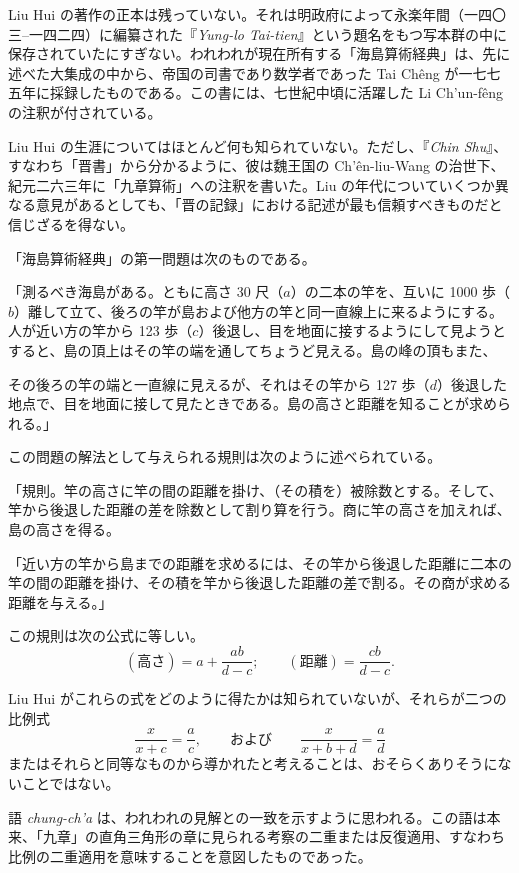 \documentclass[11pt]{article}
\newcommand{\scanpage}[2]{\clearpage\setcounter{footnote}{0}\noindent{\footnotesize\color{gray}PDF #1 頁 · #2}\par\medskip}
\newcommand{\scanfooter}{}
\begin{document}
Liu Hui の著作の正本は残っていない。それは明政府によって永楽年間（一四〇三--一四二四）に編纂された『\emph{Yung-lo Tai-tien}』という題名をもつ写本群の中に保存されていたにすぎない。われわれが現在所有する「海島算術経典」は、先に述べた大集成の中から、帝国の司書であり数学者であった Tai Chêng が一七七五年に採録したものである。この書には、七世紀中頃に活躍した Li Ch'un-fêng の注釈が付されている。

Liu Hui の生涯についてはほとんど何も知られていない。ただし、『\emph{Chin Shu}』、すなわち「晋書」から分かるように、彼は魏王国の Ch'ên-liu-Wang の治世下、紀元二六三年に「九章算術」への注釈を書いた。Liu の年代についていくつか異なる意見があるとしても、「晋の記録」における記述が最も信頼すべきものだと信じざるを得ない。

「海島算術経典」の第一問題は次のものである。

「測るべき海島がある。ともに高さ 30 尺（$a$）の二本の竿を、互いに 1000 歩（$b$）離して立て、後ろの竿が島および他方の竿と同一直線上に来るようにする。人が近い方の竿から 123 歩（$c$）後退し、目を地面に接するようにして見ようとすると、島の頂上はその竿の端を通してちょうど見える。島の峰の頂もまた、
\scanfooter

\scanpage{0049}{第五章、印刷頁35}

その後ろの竿の端と一直線に見えるが、それはその竿から 127 歩（$d$）後退した地点で、目を地面に接して見たときである。島の高さと距離を知ることが求められる。」

この問題の解法として与えられる規則は次のように述べられている。

「規則。竿の高さに竿の間の距離を掛け、（その積を）被除数とする。そして、竿から後退した距離の差を除数として割り算を行う。商に竿の高さを加えれば、島の高さを得る。

「近い方の竿から島までの距離を求めるには、その竿から後退した距離に二本の竿の間の距離を掛け、その積を竿から後退した距離の差で割る。その商が求める距離を与える。」

この規則は次の公式に等しい。
\[
(\text{高さ})=a+\frac{ab}{d-c};\qquad (\text{距離})=\frac{cb}{d-c}.
\]

Liu Hui がこれらの式をどのように得たかは知られていないが、それらが二つの比例式
\[
\frac{x}{x+c}=\frac{a}{c},\qquad \text{および}\qquad \frac{x}{x+b+d}=\frac{a}{d}
\]
またはそれらと同等なものから導かれたと考えることは、おそらくありそうにないことではない。

語 \emph{chung-ch'a} は、われわれの見解との一致を示すように思われる。この語は本来、「九章」の直角三角形の章に見られる考察の二重または反復適用、すなわち比例の二重適用を意味することを意図したものであった。
\end{document}
